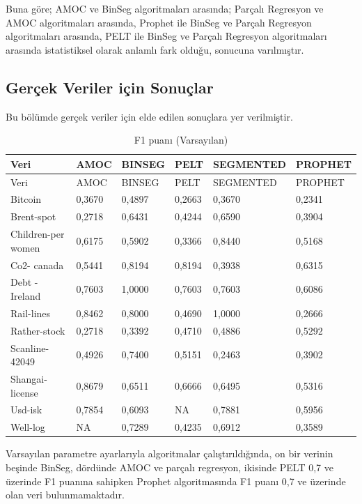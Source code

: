 \documentclass[12pt,twoside]{deuthesis}
\begin{document}
Buna göre; AMOC ve BinSeg algoritmaları arasında; Parçalı Regresyon ve AMOC algoritmaları arasında, Prophet ile BinSeg ve Parçalı Regresyon algoritmaları arasında, PELT ile BinSeg ve Parçalı Regresyon algoritmaları arasında istatistiksel olarak anlamlı fark olduğu, sonucuna varılmıştır.

\subsection{Gerçek Veriler için Sonuçlar}\label{geruxe7ek-veriler-iuxe7in-sonuuxe7lar}

Bu bölümde gerçek veriler için elde edilen sonuçlara yer verilmiştir.

\begin{longtable}[]{@{}llllll@{}}
\caption{\label{tab:nvar2} F1 puanı (Varsayılan)}\tabularnewline
\toprule\noalign{}
Veri & AMOC & BINSEG & PELT & SEGMENTED & PROPHET \\
\midrule\noalign{}
\endfirsthead
\toprule\noalign{}
Veri & AMOC & BINSEG & PELT & SEGMENTED & PROPHET \\
\midrule\noalign{}
\endhead
\bottomrule\noalign{}
\endlastfoot
Bitcoin & 0,3670 & 0,4897 & 0,2663 & 0,3670 & 0,2341 \\
Brent-spot & 0,2718 & 0,6431 & 0,4244 & 0,6590 & 0,3904 \\
Children-per women & 0,6175 & 0,5902 & 0,3366 & 0,8440 & 0,5168 \\
Co2- canada & 0,5441 & 0,8194 & 0,8194 & 0,3938 & 0,6315 \\
Debt -Ireland & 0,7603 & 1,0000 & 0,7603 & 0,7603 & 0,6086 \\
Rail-lines & 0,8462 & 0,8000 & 0,4690 & 1,0000 & 0,2666 \\
Rather-stock & 0,2718 & 0,3392 & 0,4710 & 0,4886 & 0,5292 \\
Scanline-42049 & 0,4926 & 0,7400 & 0,5151 & 0,2463 & 0,3902 \\
Shangai-license & 0,8679 & 0,6511 & 0,6666 & 0,6495 & 0,5316 \\
Usd-isk & 0,7854 & 0,6093 & NA & 0,7881 & 0,5956 \\
Well-log & NA & 0,7289 & 0,4235 & 0,6912 & 0,3589 \\
\end{longtable}

Varsayılan parametre ayarlarıyla algoritmalar çalıştırıldığında, on bir verinin beşinde BinSeg, dördünde AMOC ve parçalı regresyon, ikisinde PELT 0,7 ve üzerinde F1 puanına sahipken Prophet algoritmasında F1 puanı 0,7 ve üzerinde olan veri bulunmamaktadır.
\end{document}

